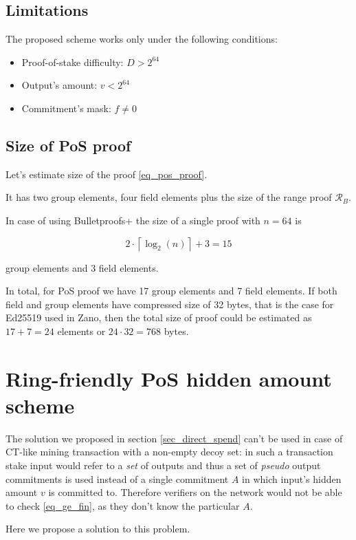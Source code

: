 \documentclass{article}
\newcommand{\ceil}[1]{\left\lceil #1 \right\rceil}
\numberwithin{figure}{section}
\begin{document}
\subsection{Limitations}

The proposed scheme works only under the following conditions:
\begin{itemize}
    \item Proof-of-stake difficulty: $D > 2^{64}$
    \item Output's amount: $v < 2^{64}$
    \item Commitment's mask: $f \neq 0$
\end{itemize}

\subsection{Size of PoS proof}

Let's estimate size of the proof \eqref{eq_pos_proof}.

It has two group elements, four field elements plus the size of the range proof $\mathcal{R}_B$.

In case of using Bulletproofs+ \cite{BP+} the size of a single proof with $n = 64$ is 

\[2 \cdot \ceil{\log_2(n)} + 3 = 15\]

group elements and 3 field elements.

In total, for PoS proof we have 17 group elements and 7 field elements. If both field and group elements have compressed size of 32 bytes, that is the case for Ed25519 used in Zano, then the total size of proof could be estimated as $17+7=24$ elements or $24 \cdot 32 = 768$ bytes.


\section{Ring-friendly PoS hidden amount scheme}

The solution we proposed in section \ref{sec_direct_spend} can't be used in case of CT-like mining transaction with a non-empty decoy set: in such a transaction stake input would refer to a \textit{set} of outputs and thus a set of \textit{pseudo} output commitments is used instead of a single commitment $A$ in which input's hidden amount $v$ is committed to. Therefore verifiers on the network would not be able to check \eqref{eq_ge_fin}, as they don't know the particular $A$. 

Here we propose a solution to this problem.
\end{document}
